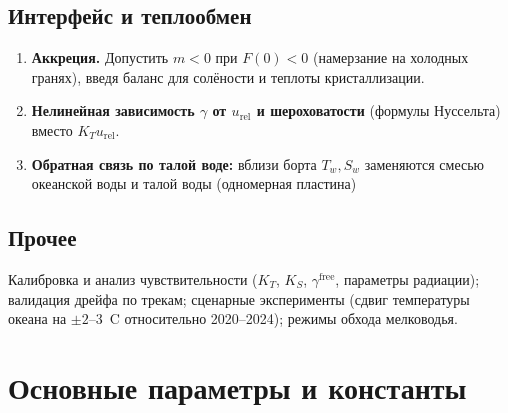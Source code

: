 \documentclass[12pt,a4paper]{article}
\begin{document}
\subsection{Интерфейс и теплообмен}
\begin{enumerate}
\item \textbf{Аккреция.} Допустить $m<0$ при $F(0)<0$ (намерзание на холодных гранях), введя баланс для солёности и теплоты кристаллизации.
\item \textbf{Нелинейная зависимость $\gamma$ от $u_{\mathrm{rel}}$ и шероховатости} (формулы Нуссельта) вместо $K_Tu_{\mathrm{rel}}$.
\item \textbf{Обратная связь по талой воде:} вблизи борта $T_w,S_w$ заменяются смесью океанской воды и талой воды (одномерная пластина)
\end{enumerate}

\subsection{Прочее}
Калибровка и анализ чувствительности ($K_T$, $K_S$, $\gamma^{\mathrm{free}}$, параметры радиации); валидация дрейфа по трекам; сценарные эксперименты (сдвиг температуры океана на $\pm2$--$3$~\textdegree C относительно 2020--2024); режимы обхода мелководья.

\section{Основные параметры и константы}
\end{document}
